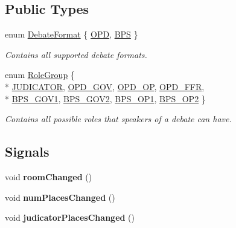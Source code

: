 \subsection*{Public Types}
\begin{DoxyCompactItemize}
\item 
enum \hyperlink{classDebate_a537fac343de1edd412012e4180b52e04}{Debate\-Format} \{ \hyperlink{classDebate_a537fac343de1edd412012e4180b52e04a57900d539b2f8b08fba5e1df1622a3ad}{O\-P\-D}, 
\hyperlink{classDebate_a537fac343de1edd412012e4180b52e04afbefbbcc339cee2cb34f1be57d2168da}{B\-P\-S}
 \}
\begin{DoxyCompactList}\small\item\em Contains all supported debate formats. \end{DoxyCompactList}\item 
enum \hyperlink{classDebate_ae9871a36a2f3de7a7da8922d70fbece4}{Role\-Group} \{ \\*
\hyperlink{classDebate_ae9871a36a2f3de7a7da8922d70fbece4a51e2aa8f170ffbd3573aa117ca5f3eef}{J\-U\-D\-I\-C\-A\-T\-O\-R}, 
\hyperlink{classDebate_ae9871a36a2f3de7a7da8922d70fbece4a2556968b87c809f30b3e88ecf9a04180}{O\-P\-D\-\_\-\-G\-O\-V}, 
\hyperlink{classDebate_ae9871a36a2f3de7a7da8922d70fbece4a7232cd09530cdbdd6b3f460de7ff2746}{O\-P\-D\-\_\-\-O\-P}, 
\hyperlink{classDebate_ae9871a36a2f3de7a7da8922d70fbece4a9682891e23a589be8ffeeb19a907ae75}{O\-P\-D\-\_\-\-F\-F\-R}, 
\\*
\hyperlink{classDebate_ae9871a36a2f3de7a7da8922d70fbece4ae40d7e19be9a051ac4967d2bc815d851}{B\-P\-S\-\_\-\-G\-O\-V1}, 
\hyperlink{classDebate_ae9871a36a2f3de7a7da8922d70fbece4a519b0f35d90b536816035fa9fa1e52f7}{B\-P\-S\-\_\-\-G\-O\-V2}, 
\hyperlink{classDebate_ae9871a36a2f3de7a7da8922d70fbece4a950ec765be37e52b2b93e5cfc619048d}{B\-P\-S\-\_\-\-O\-P1}, 
\hyperlink{classDebate_ae9871a36a2f3de7a7da8922d70fbece4a09554f5050ad1a7de30cdfab1a4bb463}{B\-P\-S\-\_\-\-O\-P2}
 \}
\begin{DoxyCompactList}\small\item\em Contains all possible roles that speakers of a debate can have. \end{DoxyCompactList}\end{DoxyCompactItemize}
\subsection*{Signals}
\begin{DoxyCompactItemize}
\item 
\hypertarget{classDebate_a726099cea8180ac30a25ef2db7ff196e}{void {\bfseries room\-Changed} ()}\label{classDebate_a726099cea8180ac30a25ef2db7ff196e}

\item 
\hypertarget{classDebate_a66121202f07f259469f34339830bbb07}{void {\bfseries num\-Places\-Changed} ()}\label{classDebate_a66121202f07f259469f34339830bbb07}

\item 
\hypertarget{classDebate_a0901bfe451901b6d31ab5c7ecbef8d4a}{void {\bfseries judicator\-Places\-Changed} ()}\label{classDebate_a0901bfe451901b6d31ab5c7ecbef8d4a}

\end{DoxyCompactItemize}
